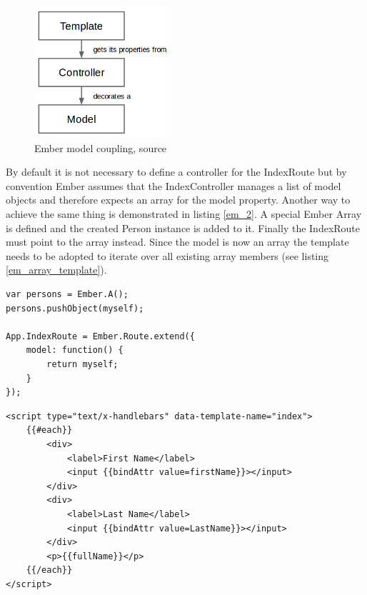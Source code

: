 \begin{figure}
	\centering	\includegraphics[width=0.45\textwidth]{./img/tech-ana/ember_controller_coupling.png}
	\caption{Ember model coupling, source \autocite{tech-ana:em-coupling}}
	\label{fig:ember_coupling}
\end{figure} 
 
By default it is not necessary to define a controller for the IndexRoute but by convention Ember assumes that the IndexController manages a list of model objects and therefore expects an array for the model property.
Another way to achieve the same thing is demonstrated in listing \ref{em_2}.
A special Ember Array is defined and the created Person instance is added to it. Finally the IndexRoute must point to the array instead.
Since the model is now an array the template needs to be adopted to iterate over all existing array members (see listing \ref{em_array_template}).

\begin{lstlisting}[label=em_2,caption=app.js]
var persons = Ember.A();
persons.pushObject(myself);

App.IndexRoute = Ember.Route.extend({
    model: function() {
        return myself;
    }
});

\end{lstlisting}     

\begin{lstlisting}[label=em_array_template,caption=index.html]
<script type="text/x-handlebars" data-template-name="index">
	{{#each}}
		<div>
			<label>First Name</label> 
			<input {{bindAttr value=firstName}}></input>
		</div>
		<div>
			<label>Last Name</label> 
			<input {{bindAttr value=LastName}}></input>
		</div>
		<p>{{fullName}}</p>
	{{/each}}
</script>
\end{lstlisting}

